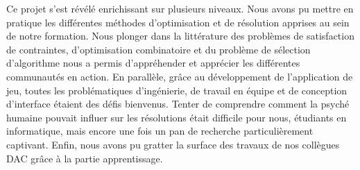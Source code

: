\documentclass[a4paper, 11pt, titlepage]{article}
\begin{document}
	Ce projet s'est révélé enrichissant sur plusieurs niveaux. Nous avons pu mettre en pratique les différentes méthodes d'optimisation et de résolution apprises au sein de notre formation. Nous plonger dans la littérature des problèmes de satisfaction de contraintes, d'optimisation combinatoire et du problème de sélection d'algorithme nous a permis d'appréhender et apprécier les différentes communautés en action. En parallèle, grâce au développement de l'application de jeu, toutes les problématiques d'ingénierie, de travail en équipe et de conception d'interface étaient des défis bienvenus. Tenter de comprendre comment la psyché humaine pouvait influer sur les résolutions était difficile pour nous, étudiants en informatique, mais encore une fois un pan de recherche particulièrement captivant. Enfin, nous avons pu gratter la surface des travaux de nos collègues DAC grâce à la partie apprentissage.
	
%	
    \printbibliography[heading=bibintoc]
    
\end{document}
